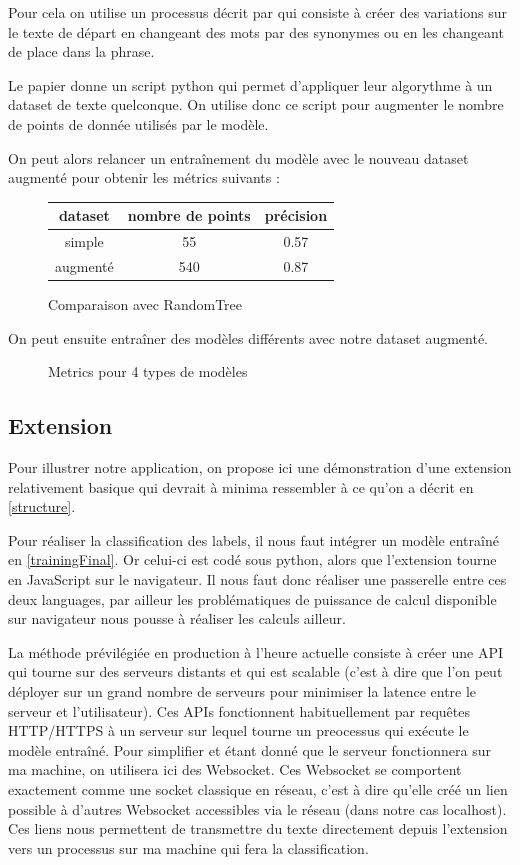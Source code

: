 \documentclass[oneside,a4paper,12pt]{article}
\begin{document}
	Pour cela on utilise un processus décrit par \cite{wei-zou-2019-eda} qui consiste à créer des variations sur le texte de départ en changeant des mots par des synonymes ou en les changeant de place dans la phrase.
	
	Le papier \cite{wei-zou-2019-eda} donne un script python qui permet d'appliquer leur algorythme à un dataset de texte quelconque. On utilise donc ce script pour augmenter le nombre de points de donnée utilisés par le modèle.
	
	On peut alors relancer un entraînement du modèle avec le nouveau dataset augmenté pour obtenir les métrics suivants :
	
	\begin{figure}[h]
		\centering
		\begin{tabular}{|c|c|c|}
			\hline
			dataset & nombre de points & précision\\
			\hline
			simple & 55 & 0.57\\
			\hline
			augmenté & 540 & 0.87\\
			\hline
		\end{tabular}
		\caption{Comparaison avec RandomTree}
	\end{figure}

	On peut ensuite entraîner des modèles différents avec notre dataset augmenté.
	\newpage
	\begin{figure}[h]
		\centering
		
		\caption{Metrics pour 4 types de modèles}
	\end{figure}
	
	\subsection{Extension}
	Pour illustrer notre application, on propose ici une démonstration d'une extension relativement basique qui devrait à minima ressembler à ce qu'on a décrit en \ref{structure}.
	
	Pour réaliser la classification des labels, il nous faut intégrer un modèle entraîné en \ref{trainingFinal}. Or celui-ci est codé sous python, alors que l'extension tourne en JavaScript sur le navigateur. 
	Il nous faut donc réaliser une passerelle entre ces deux languages, par ailleur les problématiques de puissance de calcul disponible sur navigateur nous pousse à réaliser les calculs ailleur.
	
	La méthode prévilégiée en production à l'heure actuelle consiste à créer une API qui tourne sur des serveurs distants et qui est scalable (c'est à dire que l'on peut déployer sur un grand nombre de serveurs pour minimiser la latence entre le serveur et l'utilisateur). Ces APIs fonctionnent habituellement par requêtes HTTP/HTTPS à un serveur sur lequel tourne un preocessus qui exécute le modèle entraîné.
	Pour simplifier et étant donné que le serveur fonctionnera sur ma machine, on utilisera ici des Websocket. Ces Websocket se comportent exactement comme une socket classique en réseau, c'est à dire qu'elle créé un lien possible à d'autres Websocket accessibles via le réseau (dans notre cas localhost). Ces liens nous permettent de transmettre du texte directement depuis l'extension vers un processus sur ma machine qui fera la classification.
	
\end{document}
